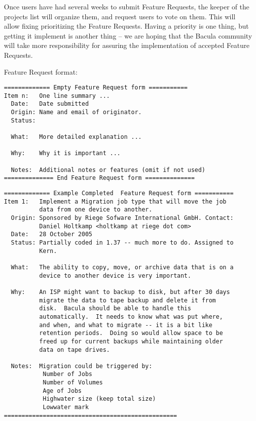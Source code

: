 Once users have had several weeks to submit Feature Requests, the keeper of
the projects list will organize them, and request users to vote on them.
This will allow fixing prioritizing the Feature Requests.  Having a
priority is one thing, but getting it implement is another thing -- we are
hoping that the Bacula community will take more responsibility for assuring
the implementation of accepted Feature Requests.

Feature Request format:
\begin{verbatim}
============= Empty Feature Request form ===========
Item n:   One line summary ...
  Date:   Date submitted
  Origin: Name and email of originator.
  Status:

  What:   More detailed explanation ...

  Why:    Why it is important ...

  Notes:  Additional notes or features (omit if not used)
============== End Feature Request form ==============
\end{verbatim}

\begin{verbatim}
============= Example Completed  Feature Request form ===========
Item 1:   Implement a Migration job type that will move the job
          data from one device to another.
  Origin: Sponsored by Riege Sofware International GmbH. Contact:
          Daniel Holtkamp <holtkamp at riege dot com>
  Date:   28 October 2005
  Status: Partially coded in 1.37 -- much more to do. Assigned to
          Kern.

  What:   The ability to copy, move, or archive data that is on a
          device to another device is very important.

  Why:    An ISP might want to backup to disk, but after 30 days
          migrate the data to tape backup and delete it from
          disk.  Bacula should be able to handle this
          automatically.  It needs to know what was put where,
          and when, and what to migrate -- it is a bit like
          retention periods.  Doing so would allow space to be
          freed up for current backups while maintaining older
          data on tape drives.

  Notes:  Migration could be triggered by:
           Number of Jobs
           Number of Volumes
           Age of Jobs
           Highwater size (keep total size)
           Lowwater mark
=================================================
\end{verbatim}


